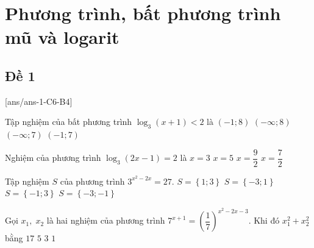 \section{Phương trình, bất phương trình mũ và logarit}

\subsection{Đề 1}
[ans/ans-1-C6-B4]
\caulc

\begin{ex}%
	Tập nghiệm của bất phương trình $\log_3 \left(x+1\right) < 2$ là
	\choice
	{\True $\left(-1; 8\right)$}
	{$\left(-\infty; 8\right)$}
	{$\left(-\infty; 7\right)$}
	{$\left(-1; 7\right)$}
\end{ex}
\begin{ex}%
	Nghiệm của phương trình $\log_3 \left(2x-1\right)=2$ là
	\choice
	{$x=3$}
	{\True $x=5$}
	{$x=\dfrac{9}{2}$}
	{$x=\dfrac{7}{2}$}
\end{ex}
\begin{ex}%
	Tập nghiệm $S$ của phương trình $3^{x^2-2x}=27$.
	\choice
	{$S=\left\{1; 3\right\}$}
	{$S=\left\{-3; 1\right\}$}
	{\True $S=\left\{-1; 3\right\}$}
	{$S=\left\{-3;-1\right\}$}
\end{ex}
\begin{ex}%
	Gọi $x_1, \; x_2$ là hai nghiệm của phương trình $7^{x+1}=\left(\dfrac{1}{7} \right)^{x^2-2x-3}$. Khi đó $x_1^2+x_2^2$ bằng
	\choice
	{$17$}
	{\True $5$}
	{$3$}
	{$1$}
\end{ex}
